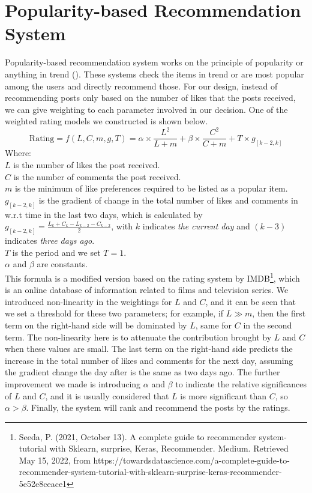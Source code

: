 \section{Popularity-based Recommendation System}
Popularity-based recommendation system works on the principle of popularity or anything in trend (\cite{popRecSystems}). These systems check the items in trend or are most popular among the users and directly recommend those. 
For our design, instead of recommending posts only based on the number of likes that the posts received, we can give weighting to each parameter involved in our decision. One of the weighted rating models we constructed is shown below.
\begin{equation*}
\text{Rating} = f(L,C,m,g,T) = \alpha \times \frac{L^{2}}{L+m} + \beta \times \frac{C^{2}}{C+m} + T \times g_{[k-2,k]}
\end{equation*}
Where:
\\$L$ is the number of likes the post received.
\\$C$ is the number of comments the post received.
\\$m$ is the minimum of like preferences required to be listed as a popular item.
\\$g_{[k-2,k]}$ is the gradient of change in the total number of likes and comments in w.r.t time in the last two days, which is calculated by 
$g_{[k-2,k]} = \frac{L_{k} + C_{k} -L_{k-2} -C_{k-2}}{2}$, with $k$ indicates \textit{the current day} and $(k-3)$ indicates \textit{three days ago}.
\\$T$ is the period and we set $T=1$.
\\ $\alpha$ and $\beta$ are constants.
\\This formula is a modified version based on the rating system by IMDB\footnote{Seeda, P. (2021, October 13). A complete guide to recommender system-tutorial with Sklearn, surprise, Keras, Recommender. Medium. Retrieved May 15, 2022, from https://towardsdatascience.com/a-complete-guide-to-recommender-system-tutorial-with-sklearn-surprise-keras-recommender-5e52e8ceace1}, which is an online database of information related to films and television series. We introduced non-linearity in the weightings for $L$ and $C$, and it can be seen that we set a threshold for these two parameters; for example, if $L \gg m$, then the first term on the right-hand side will be dominated by $L$, same for $C$ in the second term. The non-linearity here is to attenuate the contribution brought by $L$ and $C$ when these values are small. The last term on the right-hand side predicts the increase in the total number of likes and comments for the next day, assuming the gradient change the day after is the same as two days ago. The further improvement we made is introducing $\alpha$ and $\beta$ to indicate the relative significances of $L$ and $C$, and it is usually considered that $L$ is more significant than $C$, so $\alpha > \beta$. Finally, the system will rank and recommend the posts by the ratings.
